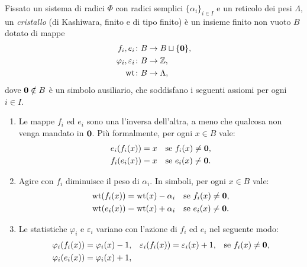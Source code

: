 \begin{definition}
    \label{def:seminormal_crystal}
    Fissato un sistema di radici $\Phi$ con radici semplici $\{ \alpha_i \}_{i\in I}$
    e un reticolo dei pesi $\Lambda$, un \emph{cristallo} (di Kashiwara, finito e di
    tipo finito) \`e un insieme finito non vuoto $B$ dotato di mappe
    \begin{align*}
        f_i, e_i &\colon B \to B \sqcup \{ \mathbf{0} \} ,   \\
        \varphi_i, \varepsilon_i &\colon B \to \mathbb{Z}  ,     \\
        \operatorname{wt} &\colon B \to \Lambda ,
    \end{align*}
    dove $\mathbf{0} \notin B$ \`e un simbolo ausiliario, che 
    soddisfano i seguenti assiomi per ogni $i \in I$.
    \begin{enumerate}[label=(A\arabic*)]
        \item \label{item:axiom_1}
            Le mappe $f_i$ ed $e_i$ sono una l'inversa dell'altra, a meno
            che qualcosa non venga mandato in $\mathbf{0}$.
            Pi\`u formalmente, per ogni $x \in B$ vale:
            \begin{align*}
                e_i ( f_i (x))  &= x    && \text{se $ f_i ( x) \neq \mathbf{0}$,}   \\
                f_i ( e_i (x))  &= x    && \text{se $ e_i (x ) \neq \mathbf{0}$.}
            \end{align*}
        \item \label{item:axiom_2}
            Agire con $f_i$ diminuisce il peso di $\alpha_i$.
            In simboli, per ogni $x \in B$ vale:
            \begin{align*}
                \operatorname{wt} (f_i (x)) &= \operatorname{wt} (x) - \alpha_i && \text{se $f_i (x) \neq \mathbf{0}$,} \\
                \operatorname{wt} (e_i (x)) &= \operatorname{wt} (x) + \alpha_i && \text{se $e_i (x) \neq \mathbf{0}$.}
            \end{align*}
        \item \label{item:axiom_3}
            Le statistiche $\varphi_i$ e $\varepsilon_i$
            variano con l'azione di $f_i$ ed $e_i$ nel seguente modo:
            \begin{align*}
                \varphi_i( f_i(x)) &= \varphi_i(x) -1,   &
                \varepsilon_i (f_i (x)) &= \varepsilon_i(x) +1 ,
                                        && \text{se $f_i(x) \neq \zero$,} \\
                \varphi_i( e_i(x)) &= \varphi_i(x) +1 ,  &

\end{align*}
\end{enumerate}
\end{definition}
